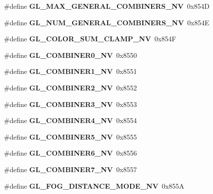 \begin{DoxyCompactItemize}
\item 
\#define {\bfseries G\+L\+\_\+\+M\+A\+X\+\_\+\+G\+E\+N\+E\+R\+A\+L\+\_\+\+C\+O\+M\+B\+I\+N\+E\+R\+S\+\_\+\+N\+V}~0x854\+D\label{_s_d_l__opengl_8h_a718e9467103f10c718e8f409030520d0}

\item 
\#define {\bfseries G\+L\+\_\+\+N\+U\+M\+\_\+\+G\+E\+N\+E\+R\+A\+L\+\_\+\+C\+O\+M\+B\+I\+N\+E\+R\+S\+\_\+\+N\+V}~0x854\+E\label{_s_d_l__opengl_8h_a8b833e034f3ea18e82df6b4e5178f50c}

\item 
\#define {\bfseries G\+L\+\_\+\+C\+O\+L\+O\+R\+\_\+\+S\+U\+M\+\_\+\+C\+L\+A\+M\+P\+\_\+\+N\+V}~0x854\+F\label{_s_d_l__opengl_8h_a2f84b9da832d5a69109de6b472cd8bcc}

\item 
\#define {\bfseries G\+L\+\_\+\+C\+O\+M\+B\+I\+N\+E\+R0\+\_\+\+N\+V}~0x8550\label{_s_d_l__opengl_8h_a15ae680c2bbc775cfaa8d522aad22710}

\item 
\#define {\bfseries G\+L\+\_\+\+C\+O\+M\+B\+I\+N\+E\+R1\+\_\+\+N\+V}~0x8551\label{_s_d_l__opengl_8h_a56b5f5a52a6961ff1821af209ac0439a}

\item 
\#define {\bfseries G\+L\+\_\+\+C\+O\+M\+B\+I\+N\+E\+R2\+\_\+\+N\+V}~0x8552\label{_s_d_l__opengl_8h_ad7a406eef71a77c86d2d8da6ef2bb1f8}

\item 
\#define {\bfseries G\+L\+\_\+\+C\+O\+M\+B\+I\+N\+E\+R3\+\_\+\+N\+V}~0x8553\label{_s_d_l__opengl_8h_abc2bd15b13c6a650bbbfd150af868425}

\item 
\#define {\bfseries G\+L\+\_\+\+C\+O\+M\+B\+I\+N\+E\+R4\+\_\+\+N\+V}~0x8554\label{_s_d_l__opengl_8h_ac7df589b288a8aa76302366e0a3a4b81}

\item 
\#define {\bfseries G\+L\+\_\+\+C\+O\+M\+B\+I\+N\+E\+R5\+\_\+\+N\+V}~0x8555\label{_s_d_l__opengl_8h_a1c4e81857846568ab09f7f1f0a00955c}

\item 
\#define {\bfseries G\+L\+\_\+\+C\+O\+M\+B\+I\+N\+E\+R6\+\_\+\+N\+V}~0x8556\label{_s_d_l__opengl_8h_aa94783ba75f06b19449413f66820e636}

\item 
\#define {\bfseries G\+L\+\_\+\+C\+O\+M\+B\+I\+N\+E\+R7\+\_\+\+N\+V}~0x8557\label{_s_d_l__opengl_8h_ad364bf97d12dfc83a755d45d013ac19a}

\item 
\#define {\bfseries G\+L\+\_\+\+F\+O\+G\+\_\+\+D\+I\+S\+T\+A\+N\+C\+E\+\_\+\+M\+O\+D\+E\+\_\+\+N\+V}~0x855\+A\label{_s_d_l__opengl_8h_aa48a9c59f8786ec0e244ea4a56dfcbb0}


\end{DoxyCompactItemize}
